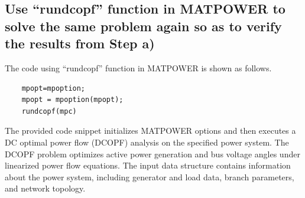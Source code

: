 \documentclass[lettersize,journal]{IEEEtran}
\begin{document}
\subsection{Use “rundcopf” function in MATPOWER to solve the same problem again so as to verify the results from Step a)}
The code using “rundcopf” function in MATPOWER is shown as follows.
\begin{lstlisting}
	mpopt=mpoption;
	mpopt = mpoption(mpopt);
	rundcopf(mpc)
\end{lstlisting}


The provided code snippet initializes MATPOWER options and then executes a DC optimal power flow (DCOPF) analysis on the specified power system. The DCOPF problem optimizes active power generation and bus voltage angles under linearized power flow equations. The input data structure contains information about the power system, including generator and load data, branch parameters, and network topology.
\end{document}
